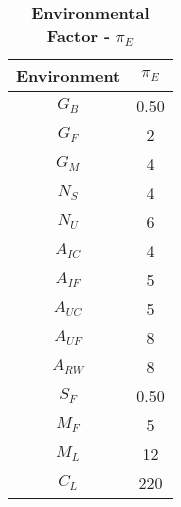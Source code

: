 \begin{table}[h]
\caption{\textbf{Environmental Factor -} $\pi_{E}$}
\label{table:envFactorIc}
\begin{tabular}{|c|c|} \hline
\rowcolor{Gray}
\textbf{Environment} & $\pi_{E}$ \\ \hline
$G_{B}$ & 0.50 \\ \hline
$G_{F}$ & 2 \\ \hline
$G_{M}$ & 4 \\ \hline
$N_{S}$ & 4 \\ \hline
$N_{U}$ & 6 \\ \hline
$A_{IC}$ & 4 \\ \hline
$A_{IF}$ & 5 \\ \hline
$A_{UC}$ & 5 \\ \hline
$A_{UF}$ & 8 \\ \hline
$A_{RW}$ & 8 \\ \hline
$S_{F}$ & 0.50 \\ \hline
$M_{F}$ & 5 \\ \hline
$M_{L}$ & 12 \\ \hline
$C_{L}$ & 220 \\ \hline
\end{tabular}
\end{table}

